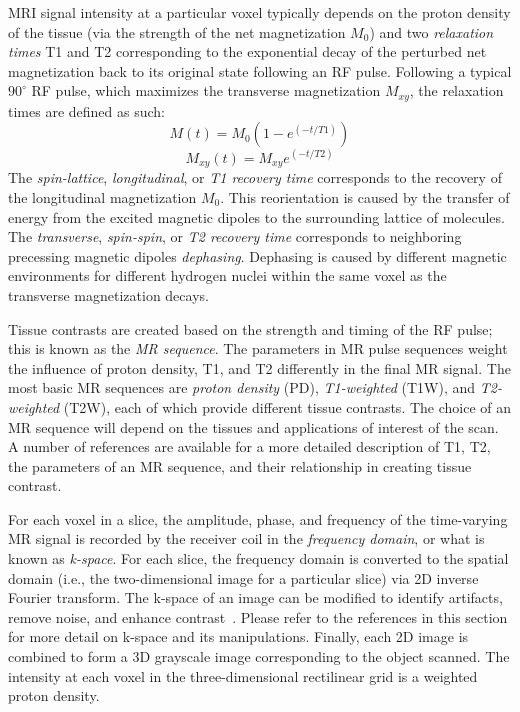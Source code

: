 MRI signal intensity at a particular voxel typically depends on the proton density of the tissue (via the strength of the net magnetization $M_0$) and two \textit{relaxation times} T1 and T2 corresponding to the exponential decay of the perturbed net magnetization back to its original state following an RF pulse. Following a typical $90^{\circ}$ RF pulse, which maximizes the transverse magnetization $M_{xy}$, the relaxation times are defined as such:
\begin{equation}
M(t) = M_0(1 - e^{(-t/T1)})
\end{equation}
\begin{equation}
M_{xy}(t) = M_{xy}e^{(-t/T2)}
\end{equation}
The \textit{spin-lattice}, \textit{longitudinal}, or \textit{T1 recovery time} corresponds to the recovery of the longitudinal magnetization $M_0$. This reorientation is caused by the transfer of energy from the excited magnetic dipoles to the surrounding lattice of molecules. The \textit{transverse}, \textit{spin-spin}, or \textit{T2 recovery time} corresponds to neighboring precessing magnetic dipoles \textit{dephasing}. Dephasing is caused by different magnetic environments for different hydrogen nuclei within the same voxel as the transverse magnetization decays.

Tissue contrasts are created based on the strength and timing of the RF pulse; this is known as the \textit{MR sequence}. The parameters in MR pulse sequences weight the influence of proton density, T1, and T2 differently in the final MR signal. The most basic MR sequences are \textit{proton density} (PD), \textit{T1-weighted} (T1W), and \textit{T2-weighted} (T2W), each of which provide different tissue contrasts. The choice of an MR sequence will depend on the tissues and applications of interest of the scan. A number of references are available  \cite{nishimura_2010, brown_semelka_2003, webb_2003} for a more detailed description of T1, T2, the parameters of an MR sequence, and their relationship in creating tissue contrast.

For each voxel in a slice, the amplitude, phase, and frequency of the time-varying MR signal is recorded by the receiver coil in the \textit{frequency domain}, or what is known as \textit{k-space}. For each slice, the frequency domain is converted to the spatial domain (i.e., the two-dimensional image for a particular slice) via 2D inverse Fourier transform. The k-space of an image can be modified to identify artifacts, remove noise, and enhance contrast~\cite{imaios}. Please refer to the references in this section for more detail on k-space and its manipulations. Finally, each 2D image is combined to form a 3D grayscale image corresponding to the object scanned. The intensity at each voxel in the three-dimensional rectilinear grid is a weighted proton density.

